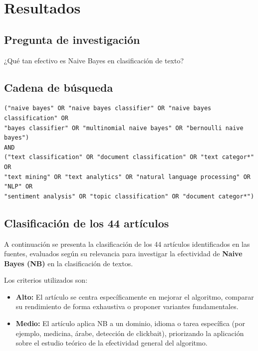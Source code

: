 \section{Resultados}\label{resultados}

\subsection{Pregunta de
investigación}\label{pregunta-de-investigaciuxf3n}

¿Qué tan efectivo es Naive Bayes en clasificación de texto?

\subsection{Cadena de búsqueda}\label{cadena-de-buxfasqueda}


\begin{verbatim}
("naive bayes" OR "naive bayes classifier" OR "naive bayes classification" OR
"bayes classifier" OR "multinomial naive bayes" OR "bernoulli naive bayes")
AND
("text classification" OR "document classification" OR "text categor*" OR
"text mining" OR "text analytics" OR "natural language processing" OR "NLP" OR
"sentiment analysis" OR "topic classification" OR "document categor*")
\end{verbatim}


\subsection{Clasificación de los 44
artículos}\label{clasificaciuxf3n-de-los-44-artuxedculos}

A continuación se presenta la clasificación de los 44 artículos identificados en las fuentes, evaluados según su relevancia para investigar la efectividad de \textbf{Naive Bayes (NB)} en la clasificación de textos.

Los criterios utilizados son:
\begin{itemize}
    \item \textbf{Alto:} El artículo se centra específicamente en mejorar el algoritmo, comparar su rendimiento de forma exhaustiva o proponer variantes fundamentales.
    \item \textbf{Medio:} El artículo aplica NB a un dominio, idioma o tarea específica (por ejemplo, medicina, árabe, detección de clickbait), priorizando la aplicación sobre el estudio teórico de la efectividad general del algoritmo.
\end{itemize}

